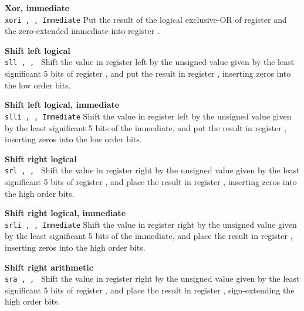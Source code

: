 \noindent
{\bf Xor, immediate}\\
\noindent
\texttt{xori \regd, \regs, Immediate}
Put the result of the logical exclusive-OR of register \regs{} and the zero-extended immediate into register \regd{}.
\vspace{3ex}

\noindent
{\bf Shift left logical}\\
\noindent
\texttt{sll \regd, \regs, \regt}
Shift the value in register \regs{} left by the unsigned value given by the
least significant 5 bits of register \regt{}, and put the result in register \regd{},
inserting zeros into the low order bits.
\vspace{3ex}

\noindent
{\bf Shift left logical, immediate}\\
\noindent
\texttt{slli \regd, \regs, Immediate}
Shift the value in register \regs{} left by the unsigned value given by the
least significant 5 bits of the immediate, and put the result in register \regd{},
inserting zeros into the low order bits.
\vspace{3ex}

\noindent
{\bf Shift right logical}\\
\noindent
\texttt{srl \regd, \regs, \regt}
Shift the value in register \regs{} right by the unsigned value given by the
least significant 5 bits of register \regt{}, and place the result in register \regd{},
inserting zeros into the high order bits.
\vspace{3ex}

\noindent
{\bf Shift right logical, immediate}\\
\noindent
\texttt{srli \regd, \regs, Immediate}
Shift the value in register \regs{} right by the unsigned value given by the
least significant 5 bits of the immediate, and place the result in register \regd{},
inserting zeros into the high order bits.
\vspace{3ex}
\newpage

\noindent
{\bf Shift right arithmetic}\\
\noindent
\texttt{sra \regd, \regs, \regt}
Shift the value in register \regs{} right by the unsigned value given by the
least significant 5 bits of register \regt{}, and place the result in register \regd{},
sign-extending the high order bits.
\vspace{3ex}

